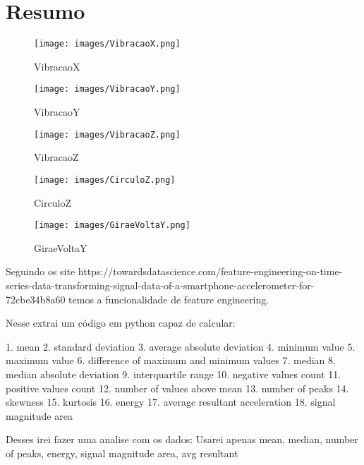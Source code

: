 \section{Resumo}


\begin{figure}[h!]
    \centering
    \label{fig1}
    \texttt{[image: images/VibracaoX.png]}
    \caption{VibracaoX}
\end{figure}

\begin{figure}[h!]
    \centering
    \label{fig2}
    \texttt{[image: images/VibracaoY.png]}
    \caption{VibracaoY}
\end{figure}

\begin{figure}[h!]
    \centering
    \label{fig3}
    \texttt{[image: images/VibracaoZ.png]}
    \caption{VibracaoZ}
\end{figure}

\begin{figure}[h!]
    \centering
    \label{fig4}
    \texttt{[image: images/CirculoZ.png]}
    \caption{CirculoZ}
\end{figure}
\begin{figure}[h!]
    \centering
    \label{fig5}
    \texttt{[image: images/GiraeVoltaY.png]}
    \caption{GiraeVoltaY}
\end{figure}



Seguindo os site https://towardsdatascience.com/feature-engineering-on-time-series-data-transforming-signal-data-of-a-smartphone-accelerometer-for-72cbe34b8a60
temos a funcionalidade de feature engineering.

Nesse extrai um código em python capaz de calcular:

1. mean
2. standard deviation
3. average absolute deviation
4. minimum value
5. maximum value
6. difference of maximum and minimum values
7. median
8. median absolute deviation
9. interquartile range
10. negative values count
11. positive values count
12. number of values above mean
13. number of peaks
14. skewness
15. kurtosis
16. energy
17. average resultant acceleration
18. signal magnitude area

Desses irei fazer uma analise com os dados:
Usarei apenas mean, median, number of peaks, energy, signal magnitude area, avg resultant

